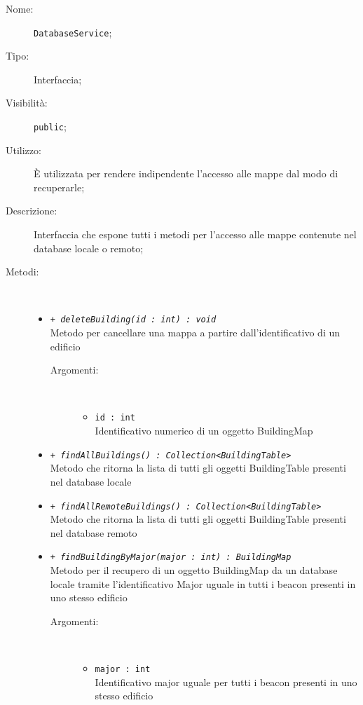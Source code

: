 \documentclass[../DefinizioneDiProdotto.tex]{subfiles}
\begin{document}
\begin{description}
	\item[Nome:] \texttt{DatabaseService};
	\item[Tipo:] Interfaccia;
	\item[Visibilità:] \texttt{public};
	\item[Utilizzo:] È utilizzata per rendere indipendente l'accesso alle mappe dal modo di recuperarle;
	\item[Descrizione:] Interfaccia che espone tutti i metodi per l'accesso alle mappe contenute nel database locale o remoto;
	\item[Metodi:] \
	\begin{itemize}
		\item \texttt{+ \textit{deleteBuilding(id : int) : void}}\\
		Metodo per cancellare una mappa a partire dall'identificativo di un edificio
		\begin{description}
			\item[Argomenti:] \
			\begin{itemize}
				\item \texttt{id : int}\\
				Identificativo numerico di un oggetto BuildingMap\end{itemize}
		\end{description}
		\item \texttt{+ \textit{findAllBuildings() : Collection<BuildingTable>}}\\
		Metodo che ritorna la lista di tutti gli oggetti BuildingTable presenti nel database locale
		\item \texttt{+ \textit{findAllRemoteBuildings() : Collection<BuildingTable>}}\\
		Metodo che ritorna la lista di tutti gli oggetti BuildingTable presenti nel database remoto
		\item \texttt{+ \textit{findBuildingByMajor(major : int) : BuildingMap}}\\
		Metodo per il recupero di un oggetto BuildingMap da un database locale tramite l'identificativo Major uguale in tutti i beacon presenti in uno stesso edificio
		\begin{description}
			\item[Argomenti:] \
			\begin{itemize}
				\item \texttt{major : int}\\
				Identificativo major uguale per tutti i beacon presenti in uno stesso edificio\end{itemize}

\end{description}
\end{itemize}
\end{description}
\end{document}

